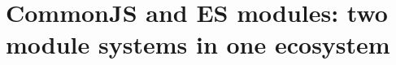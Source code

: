 \chapter{CommonJS and ES modules: two module systems in one ecosystem}
\label{ch:commonjs-and-es-modules-two-module}

